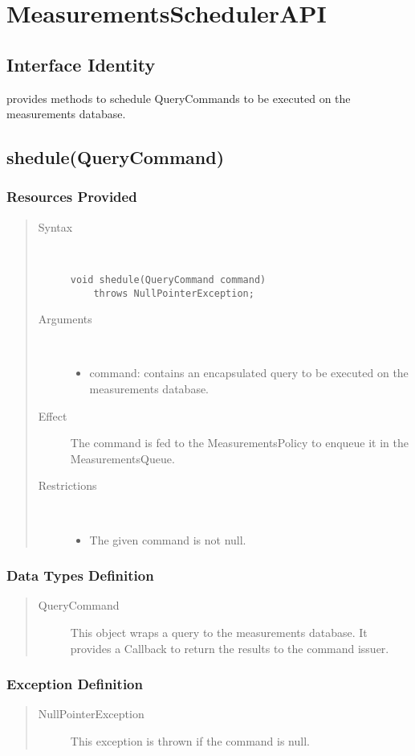 \section{MeasurementsSchedulerAPI}

\subsection{Interface Identity}

\npar {} provides methods to schedule
QueryCommands to be executed on the measurements database.

\subsection{shedule(QueryCommand)}

\subsubsection{Resources Provided}

\begin{quote}
	\begin{description}
		\item[Syntax] \ 
		\begin{verbatim}
void shedule(QueryCommand command)
    throws NullPointerException;
		\end{verbatim}
		\item[Arguments] \
		\begin{itemize}
			\item command: contains an encapsulated query to be executed on the
			measurements database.
		\end{itemize}
		\item[Effect] The command is fed to the MeasurementsPolicy to enqueue it
		in the MeasurementsQueue.
		\item[Restrictions] \ 
		\begin{itemize}
			\item The given command is not null.
		\end{itemize}
	\end{description} 
\end{quote}

\subsubsection{Data Types Definition}

\begin{quote}
	\begin{description}
		\item[QueryCommand] This object wraps a query to the measurements database. It
		provides a Callback to return the results to the command issuer.
	\end{description} 
\end{quote}

\subsubsection{Exception Definition}

\begin{quote}
	\begin{description}
		\item[NullPointerException] This exception is thrown if the command is null.
	\end{description} 
\end{quote}
